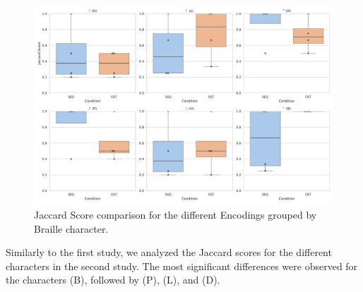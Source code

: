 \begin{figure}
    \centering
    \includegraphics[width=\linewidth]{src/pictures/Study2Data_Experiment/Eval/test.pdf}
    \caption{Jaccard Score comparison for the different Encodings grouped by Braille character.}
    \label{fig:f1score_test_study2}
\end{figure}


\begin{table}[ht]
\caption{Results of the \gls{mwu} for significance grouped by the different Braille characters during learning for the different Encodings with Cohen's d.}
\label{table:learning_significance_results_secondStudy_nonPar}
\end{table}

Similarly to the first study, we analyzed the Jaccard scores for the different characters in the second study. The most significant differences were observed for the characters (B), followed by (P), (L), and (D).

